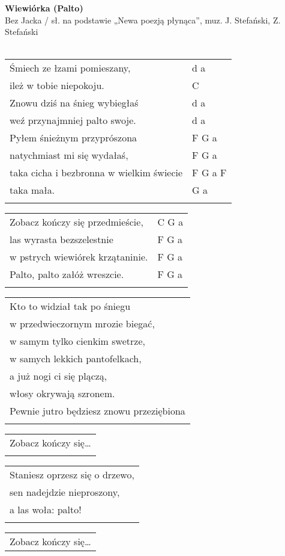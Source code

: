 \documentclass[a5paper]{article}
\begin{document}


\noindent
\fontsize{12pt}{15pt}\selectfont
\textbf{Wiewiórka (Palto)} \\
\fontsize{8pt}{10pt}\selectfont
Bez Jacka / sł. na podstawie „Newa poezją płynąca”, muz. J. Stefański, Z. Stefański\\ \\
\fontsize{10pt}{12pt}\selectfont
{}
\begin{tabular}{@{}p{8.00cm}p{3cm}@{}}
\noindent
Śmiech ze łzami pomieszany, & d a \\
ileż w tobie niepokoju. & C \\
Znowu dziś na śnieg wybiegłaś & d a \\
weź przynajmniej palto swoje. & d a \\
Pyłem śnieżnym przyprószona & F G a \\
natychmiast mi się wydałaś, & F G a \\
taka cicha i bezbronna w wielkim świecie & F G a F \\
taka mała. & G a \\ \\
\end{tabular}

\noindent
\begin{tabular}{@{}p{7.00cm}p{3cm}@{}}
Zobacz kończy się przedmieście, & C G a \\
las wyrasta bezszelestnie & F G a \\
w pstrych wiewiórek krzątaninie. & F G a \\
Palto, palto załóż wreszcie. & F G a \\ \\
\end{tabular}

\noindent
\begin{tabular}{@{}p{8.00cm}@{}}
Kto to widział tak po śniegu \\
w przedwieczornym mrozie biegać, \\
w samym tylko cienkim swetrze, \\
w samych lekkich pantofelkach, \\
a już nogi ci się plączą, \\
włosy okrywają szronem. \\
Pewnie jutro będziesz znowu przeziębiona \\ \\
\end{tabular}

\noindent
\begin{tabular}{@{}p{7.00cm}@{}}
Zobacz kończy się… \\ \\
\end{tabular}

\noindent
\begin{tabular}{@{}p{8.00cm}@{}}
Staniesz oprzesz się o drzewo, \\
sen nadejdzie nieproszony, \\
a las woła: palto! \\ \\
\end{tabular}

\noindent
\begin{tabular}{@{}p{7.00cm}@{}}
Zobacz kończy się…
\end{tabular}
\end{document}
